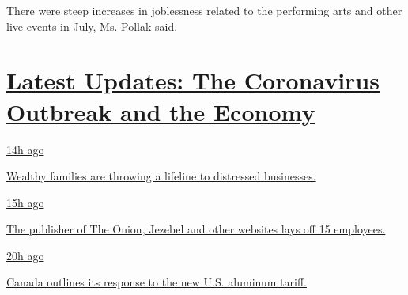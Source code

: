 There were steep increases in joblessness related to the performing arts
and other live events in July, Ms. Pollak said.

\hypertarget{latest-updates-the-coronavirus-outbreak-and-the-economy}{%
\section{\texorpdfstring{\href{https://www.nytimes.com/live/2020/08/07/business/stock-market-today-coronavirus?action=click\&pgtype=Article\&state=default\&region=MAIN_CONTENT_1\&context=storylines_live_updates}{Latest
Updates: The Coronavirus Outbreak and the
Economy}}{Latest Updates: The Coronavirus Outbreak and the Economy}}\label{latest-updates-the-coronavirus-outbreak-and-the-economy}}

\href{https://www.nytimes.com/live/2020/08/07/business/stock-market-today-coronavirus?action=click\&pgtype=Article\&state=default\&region=MAIN_CONTENT_1\&context=storylines_live_updates\#wealthy-families-are-throwing-a-lifeline-to-distressed-businesses}{14h
ago}

\href{https://www.nytimes.com/live/2020/08/07/business/stock-market-today-coronavirus?action=click\&pgtype=Article\&state=default\&region=MAIN_CONTENT_1\&context=storylines_live_updates\#wealthy-families-are-throwing-a-lifeline-to-distressed-businesses}{Wealthy
families are throwing a lifeline to distressed businesses.}

\href{https://www.nytimes.com/live/2020/08/07/business/stock-market-today-coronavirus?action=click\&pgtype=Article\&state=default\&region=MAIN_CONTENT_1\&context=storylines_live_updates\#the-publisher-of-the-onion-jezebel-and-other-websites-lays-off-15-employees}{15h
ago}

\href{https://www.nytimes.com/live/2020/08/07/business/stock-market-today-coronavirus?action=click\&pgtype=Article\&state=default\&region=MAIN_CONTENT_1\&context=storylines_live_updates\#the-publisher-of-the-onion-jezebel-and-other-websites-lays-off-15-employees}{The
publisher of The Onion, Jezebel and other websites lays off 15
employees.}

\href{https://www.nytimes.com/live/2020/08/07/business/stock-market-today-coronavirus?action=click\&pgtype=Article\&state=default\&region=MAIN_CONTENT_1\&context=storylines_live_updates\#canada-outlines-its-response-to-the-new-us-aluminum-tariff}{20h
ago}

\href{https://www.nytimes.com/live/2020/08/07/business/stock-market-today-coronavirus?action=click\&pgtype=Article\&state=default\&region=MAIN_CONTENT_1\&context=storylines_live_updates\#canada-outlines-its-response-to-the-new-us-aluminum-tariff}{Canada
outlines its response to the new U.S. aluminum tariff.}

